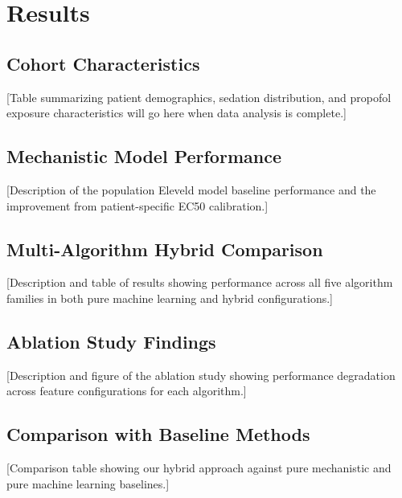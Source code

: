 \documentclass[11pt,a4paper]{article}
\begin{document}
\section{Results}

\subsection{Cohort Characteristics}

[Table summarizing patient demographics, sedation distribution, and propofol exposure characteristics will go here when data analysis is complete.]

\subsection{Mechanistic Model Performance}

[Description of the population Eleveld model baseline performance and the improvement from patient-specific EC50 calibration.]

\subsection{Multi-Algorithm Hybrid Comparison}

[Description and table of results showing performance across all five algorithm families in both pure machine learning and hybrid configurations.]

\subsection{Ablation Study Findings}

[Description and figure of the ablation study showing performance degradation across feature configurations for each algorithm.]

\subsection{Comparison with Baseline Methods}

[Comparison table showing our hybrid approach against pure mechanistic and pure machine learning baselines.]

%
\end{document}

